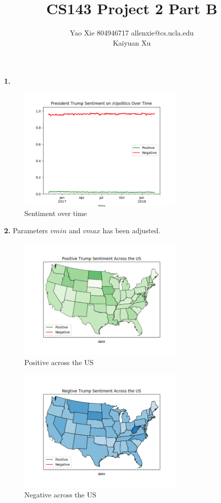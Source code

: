 \documentclass{article}
\begin{document}
\title{CS143 Project 2 Part B}
\author{Yao Xie 804946717 allenxie@cs.ucla.edu\\Kaiyuan Xu }
\maketitle

\textbf{1.}
\begin{figure}[H]
\centering
\includegraphics[width=0.7\textwidth]{1.png}
\caption{Sentiment over time}\label{1}
\end{figure}


\textbf{2.} Parameters $vmin$ and $vmax$ has been adjusted.
\begin{figure}[H]
\centering
\includegraphics[width=0.7\textwidth]{2.png}
\caption{Positive across the US}\label{2}
\end{figure}
\begin{figure}[H]
\centering
\includegraphics[width=0.7\textwidth]{3.png}
\caption{Negative across the US}\label{3}
\end{figure}
\end{document}
